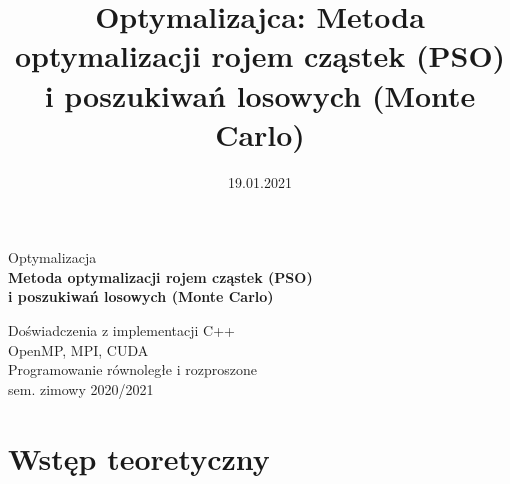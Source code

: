 \documentclass[handout]{beamer}
\date{19.01.2021}
\title{Optymalizajca: Metoda optymalizacji rojem cząstek (PSO) i poszukiwań losowych (Monte Carlo)}
\institute{Politechnika Warszawska}
\renewcommand*{\small}{\fontsize{8}{9.6}\selectfont}
\renewcommand*{\Large}{\fontsize{12}{14.4}\selectfont}
\renewcommand*{\LARGE}{\fontsize{14}{16.8}\selectfont}
\begin{document}
\begin{frame}


\begin{center}
\vspace{.3cm}
Optymalizacja \\

\vspace{.3cm}
{\LARGE \textbf{Metoda optymalizacji rojem cząstek (PSO) \\ i poszukiwań losowych (Monte Carlo)}}

\vspace{.8cm}
{\Large Doświadczenia z implementacji C++} \\
\vspace{.2cm}
{\Large OpenMP, MPI, CUDA} \\

\vspace{1.2cm}
{\small Programowanie równoległe i rozproszone \\ sem. zimowy 2020/2021}
\end{center}


\end{frame}




\section{Wstęp teoretyczny}
\end{document}
